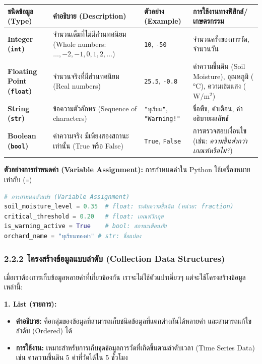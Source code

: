 \documentclass[11pt,a4paper,openany]{report}
\begin{document}
\begin{table}[htbp]
\centering
\begin{tabularx}{\textwidth}{L L L L}
\toprule
ชนิดข้อมูล (Type) & คำอธิบาย (Description) & ตัวอย่าง (Example) & การใช้งานทางฟิสิกส์/เกษตรกรรม \\
\midrule
\textbf{Integer (\texttt{int})} & จำนวนเต็มที่ไม่มีส่วนทศนิยม (Whole numbers: $\dots, -2, -1, 0, 1, 2, \dots$) & \texttt{10}, \texttt{-50} & จำนวนครั้งของการวัด, จำนวนวัน \\
\textbf{Floating Point (\texttt{float})} & จำนวนจริงที่มีส่วนทศนิยม (Real numbers) & \texttt{25.5}, \texttt{-0.8} & ค่าความชื้นดิน (Soil Moisture), อุณหภูมิ ($\text{°C}$), ความเข้มแสง ($\text{W}/\text{m}^2$) \\
\textbf{String (\texttt{str})} & ข้อความตัวอักษร (Sequence of characters) & \texttt{"ทุเรียน"}, \texttt{"Warning!"} & ชื่อพืช, คำเตือน, คำอธิบายผลลัพธ์ \\
\textbf{Boolean (\texttt{bool})} & ค่าความจริง มีเพียงสองสถานะเท่านั้น (True หรือ False) & \texttt{True}, \texttt{False} & การตรวจสอบเงื่อนไข (เช่น: \textit{ความชื้นต่ำกว่าเกณฑ์หรือไม่?}) \\
\bottomrule
\end{tabularx}
\end{table}


\textbf{ตัวอย่างการกำหนดค่า (Variable Assignment):}
การกำหนดค่าใน Python ใช้เครื่องหมายเท่ากับ (\texttt{=})

\begin{lstlisting}[language=Python]
# การกำหนดตัวแปร (Variable Assignment)
soil_moisture_level = 0.35  # float: ระดับความชื้นดิน (หน่วย: fraction)
critical_threshold = 0.20   # float: เกณฑ์วิกฤต
is_warning_active = True    # bool: สถานะเตือนภัย
orchard_name = "ทุเรียนทองคำ" # str: ชื่อแปลง
\end{lstlisting}


\subsubsection{2.2.2 โครงสร้างข้อมูลแบบลำดับ (Collection Data Structures)}


เมื่อเราต้องการเก็บข้อมูลหลายค่าที่เกี่ยวข้องกัน เราจะไม่ใช้ตัวแปรเดี่ยวๆ แต่จะใช้โครงสร้างข้อมูลเหล่านี้:

\textbf{1. List (รายการ):}
\begin{itemize}
  \item \textbf{คำอธิบาย:} คือกลุ่มของข้อมูลที่สามารถเก็บชนิดข้อมูลที่แตกต่างกันได้หลายค่า และสามารถแก้ไขลำดับ (Ordered) ได้
  \item \textbf{การใช้งาน:} เหมาะสำหรับการเก็บชุดข้อมูลการวัดที่เกิดขึ้นตามลำดับเวลา (Time Series Data) เช่น ค่าความชื้นดิน 5 ค่าที่วัดได้ใน 5 ชั่วโมง
\end{itemize}
\end{document}
